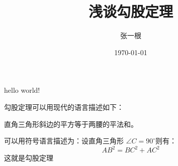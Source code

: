\documentclass{article}
\title{\heiti 浅谈勾股定理}
\author{\kaishu 张一根}
\date{\today}
\newcommand\degree{^\circ}
\begin{document}
    \maketitle
    hello world!
    
    勾股定理可以用现代的语言描述如下：
    
    直角三角形斜边的平方等于两腰的平法和。
    
    可以用符号语言描述为：设直角三角形 
    $\angle C=90\degree $则有：
    $$ 
    	AB^2 = BC^2 + AC^2 
    $$
    这就是勾股定理
\end{document}
